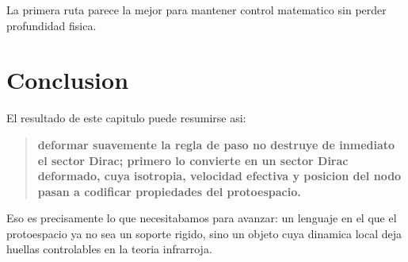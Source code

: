 La primera ruta parece la mejor para mantener control matematico sin perder profundidad fisica.

\section*{Conclusion}
El resultado de este capitulo puede resumirse asi:
\begin{quote}
\textbf{deformar suavemente la regla de paso no destruye de inmediato el sector Dirac; primero lo convierte en un sector Dirac deformado, cuya isotropia, velocidad efectiva y posicion del nodo pasan a codificar propiedades del protoespacio.}
\end{quote}

Eso es precisamente lo que necesitabamos para avanzar: un lenguaje en el que el protoespacio ya no sea un soporte rigido, sino un objeto cuya dinamica local deja huellas controlables en la teoria infrarroja.
